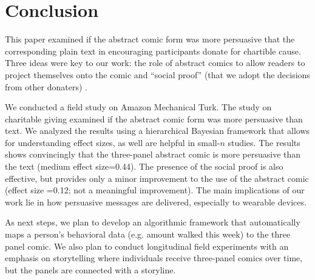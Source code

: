 \section{Conclusion}
\label{sec:Conclusion}

This paper examined if the abstract comic form was more persuasive that the corresponding plain text in encouraging participants donate for chartible cause.  Three ideas were key to our work: the role of abstract comics to allow readers to project themselves onto the comic and ``social proof'' (that we adopt the decisions from other donaters) .

We conducted a field study on Amazon Mechanical Turk. The study on charitable giving examined if the abstract comic form was more persuasive than text. We analyzed the results using a hierarchical Bayesian framework that allows for understanding effect sizes, as well are helpful in small-$n$ studies. The results shows convincingly that the three-panel abstract comic is more persuasive than the text (medium effect size=0.44). The presence of the social proof is also effective, but provides only a minor improvement to the use of the abstract comic (effect size =0.12; not a meaningful improvement). The main implications of our work lie in how persuasive messages are delivered, especially to wearable devices.


As next steps, we plan to develop an algorithmic framework that automatically maps a person's behavioral data (e.g. amount walked this week) to the three panel comic. We also plan to conduct longitudinal field experiments with an emphasis on storytelling where individuals receive three-panel comics over time, but the panels are connected with a storyline.
